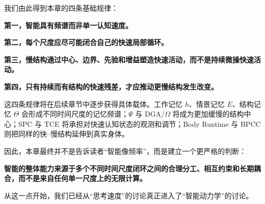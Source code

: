 我们由此得到本章的四条基础规律：

\begin{proposition*}
\bfseries 第一，智能具有频谱而非单一认知速度。
\end{proposition*}

\begin{statementbox}
\bfseries 第二，每个尺度应尽可能闭合自己的快速局部循环。
\end{statementbox}

\begin{statementbox}
\bfseries 第三，慢结构通过中心、边界、先验和增益塑造快速活动，而不是持续微操快速活动。
\end{statementbox}

\begin{statementbox}
\bfseries 第四，只有持续而有结构的快速残差，才应推动更慢结构发生改变。
\end{statementbox}

这四条规律将在后续章节中逐步获得具体载体。工作记忆 $h$、情景记忆 $E$、结构记忆 $\Theta$ 会形成不同时间尺度的记忆频谱；$\Psi$ 与 DGA/$\Omega$ 将成为更加缓慢的结构中心；SPC 与 TCE 将承担对快速认知状态的观测和调节；Body Runtime 与 BPCC 则把同样的快--慢结构延伸到真实身体。

因此，本章最终并不是告诉读者“智能像频率”，而是建立一个更严格的判断：

\begin{proposition*}
\bfseries
智能的整体能力来源于多个不同时间尺度闭环之间的合理分工、相互约束和长期耦合，而不是来自任何单一尺度上的无限计算。
\end{proposition*}

从这一点开始，我们已经从“思考速度”的讨论真正进入了“智能动力学”的讨论。
